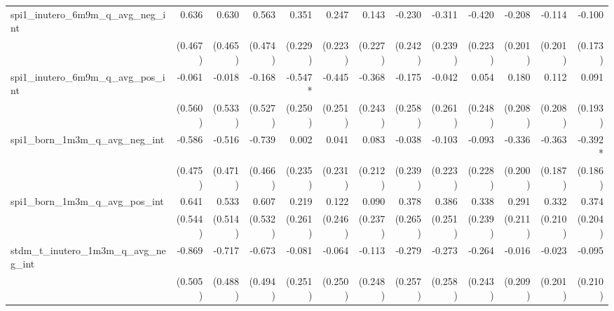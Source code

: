 \begin{tabular}{lrrrrrrrrrrrr}
spi1\_inutero\_6m9m\_q\_avg\_neg\_int       &        0.636 &        0.630 &        0.563 &        0.351 &        0.247 &        0.143 &       -0.230 &       -0.311 &       -0.420 &       -0.208 &       -0.114 &       -0.100 \\ 
                                            &      (0.467) &      (0.465) &      (0.474) &      (0.229) &      (0.223) &      (0.227) &      (0.242) &      (0.239) &      (0.223) &      (0.201) &      (0.201) &      (0.173) \\ 
spi1\_inutero\_6m9m\_q\_avg\_pos\_int       &       -0.061 &       -0.018 &       -0.168 &      -0.547* &       -0.445 &       -0.368 &       -0.175 &       -0.042 &        0.054 &        0.180 &        0.112 &        0.091 \\ 
                                            &      (0.560) &      (0.533) &      (0.527) &      (0.250) &      (0.251) &      (0.243) &      (0.258) &      (0.261) &      (0.248) &      (0.208) &      (0.208) &      (0.193) \\ 
spi1\_born\_1m3m\_q\_avg\_neg\_int          &       -0.586 &       -0.516 &       -0.739 &        0.002 &        0.041 &        0.083 &       -0.038 &       -0.103 &       -0.093 &       -0.336 &       -0.363 &      -0.392* \\ 
                                            &      (0.475) &      (0.471) &      (0.466) &      (0.235) &      (0.231) &      (0.212) &      (0.239) &      (0.223) &      (0.228) &      (0.200) &      (0.187) &      (0.186) \\ 
spi1\_born\_1m3m\_q\_avg\_pos\_int          &        0.641 &        0.533 &        0.607 &        0.219 &        0.122 &        0.090 &        0.378 &        0.386 &        0.338 &        0.291 &        0.332 &        0.374 \\ 
                                            &      (0.544) &      (0.514) &      (0.532) &      (0.261) &      (0.246) &      (0.237) &      (0.265) &      (0.251) &      (0.239) &      (0.211) &      (0.210) &      (0.204) \\ 
stdm\_t\_inutero\_1m3m\_q\_avg\_neg\_int    &       -0.869 &       -0.717 &       -0.673 &       -0.081 &       -0.064 &       -0.113 &       -0.279 &       -0.273 &       -0.264 &       -0.016 &       -0.023 &       -0.095 \\ 
                                            &      (0.505) &      (0.488) &      (0.494) &      (0.251) &      (0.250) &      (0.248) &      (0.257) &      (0.258) &      (0.243) &      (0.209) &      (0.201) &      (0.210) \\ 

\end{tabular}
